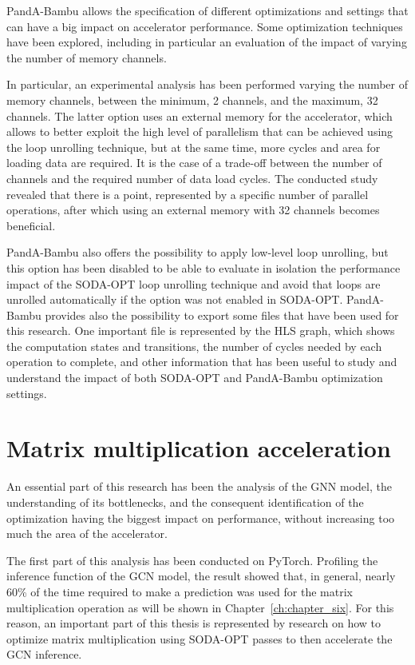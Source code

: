 PandA-Bambu allows the specification of different optimizations and settings that can have a big impact on accelerator performance.
Some optimization techniques have been explored, including in particular an evaluation of the impact of varying the number of memory channels.

In particular, an experimental analysis has been performed varying the number of memory channels, between the minimum, 2 channels, and the maximum, 32 channels.
The latter option uses an external memory for the accelerator, which allows to better exploit the high level of parallelism that can be achieved using the loop unrolling technique, but at the same time, more cycles and area for loading data are required.
It is the case of a trade-off between the number of channels and the required number of data load cycles.
The conducted study revealed that there is a point, represented by a specific number of parallel operations, after which using an external memory with 32 channels becomes beneficial.

PandA-Bambu also offers the possibility to apply low-level loop unrolling, but this option has been disabled to be able to evaluate in isolation the performance impact of the SODA-OPT loop unrolling technique and avoid that loops are unrolled automatically if the option was not enabled in SODA-OPT\@.
PandA-Bambu provides also the possibility to export some files that have been used for this research.
One important file is represented by the HLS graph, which shows the computation states and transitions, the number of cycles needed by each operation to complete, and other information that has been useful to study and understand the impact of both SODA-OPT and PandA-Bambu optimization settings.

\section{Matrix multiplication acceleration}
\label{sec:matmul-algo}%

An essential part of this research has been the analysis of the GNN model, the understanding of its bottlenecks, and the consequent identification of the optimization having the biggest impact on performance, without increasing too much the area of the accelerator.

The first part of this analysis has been conducted on PyTorch.
Profiling the inference function of the GCN model, the result showed that, in general, nearly 60\% of the time required to make a prediction was used for the matrix multiplication operation as will be shown in Chapter~\ref{ch:chapter_six}.
For this reason, an important part of this thesis is represented by research on how to optimize matrix multiplication using SODA-OPT passes to then accelerate the GCN inference.


